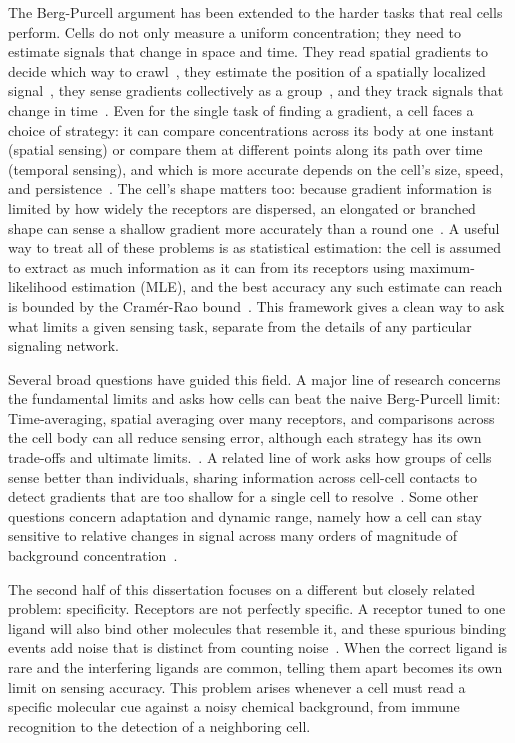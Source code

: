 The Berg-Purcell argument has been extended to the harder tasks that real cells perform.
Cells do not only measure a uniform concentration; they need to estimate signals that change in space and time.
They read spatial gradients to decide which way to crawl~\cite{hu2011how, hu2010physical}, they estimate the position of a spatially localized signal~\cite{wasnik2019accuracy}, they sense gradients collectively as a group~\cite{ipina2022collective, camley2016emergent}, and they track signals that change in time~\cite{mora2010limits}.
Even for the single task of finding a gradient, a cell faces a choice of strategy: it can compare concentrations across its body at one instant (spatial sensing) or compare them at different points along its path over time (temporal sensing), and which is more accurate depends on the cell's size, speed, and persistence~\cite{rode2024information}.
The cell's shape matters too: because gradient information is limited by how widely the receptors are dispersed, an elongated or branched shape can sense a shallow gradient more accurately than a round one~\cite{mou2025optimal}.
A useful way to treat all of these problems is as statistical estimation: the cell is assumed to extract as much information as it can from its receptors using maximum-likelihood estimation (MLE), and the best accuracy any such estimate can reach is bounded by the Cram\'er-Rao bound~\cite{endres2009maximum}.
This framework gives a clean way to ask what limits a given sensing task, separate from the details of any particular signaling network.

Several broad questions have guided this field.
A major line of research concerns the fundamental limits and asks how cells can beat the naive Berg-Purcell limit: Time-averaging, spatial averaging over many receptors, and comparisons across the cell body can all reduce sensing error, although each strategy has its own trade-offs and ultimate limits.~\cite{ten2016fundamental}.
A related line of work asks how groups of cells sense better than individuals, sharing information across cell-cell contacts to detect gradients that are too shallow for a single cell to resolve~\cite{ipina2022collective, camley2016emergent}.
Some other questions concern adaptation and dynamic range, namely how a cell can stay sensitive to relative changes in signal across many orders of magnitude of background concentration~\cite{endres2006precise, srinivasan2026perfect}.

The second half of this dissertation focuses on a different but closely related problem: specificity.
Receptors are not perfectly specific.
A receptor tuned to one ligand will also bind other molecules that resemble it, and these spurious binding events add noise that is distinct from counting noise~\cite{mora2015physical, singh2017simple}.
When the correct ligand is rare and the interfering ligands are common, telling them apart becomes its own limit on sensing accuracy.
This problem arises whenever a cell must read a specific molecular cue against a noisy chemical background, from immune recognition to the detection of a neighboring cell.

